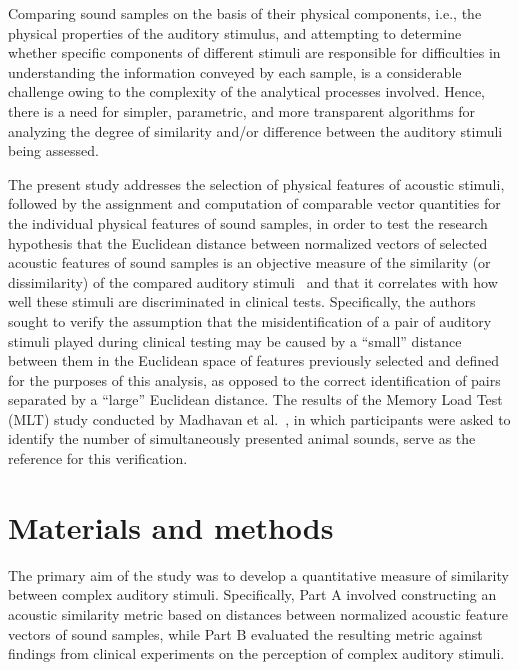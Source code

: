 \documentclass[doubleblind,preprint,12pt]{elsarticle}
\begin{document}
Comparing sound samples on the basis of their physical components, i.e., the physical properties of the auditory stimulus, and attempting to determine whether specific components of different stimuli are responsible for difficulties in understanding the information conveyed by each sample, is a considerable challenge owing to the complexity of the analytical processes involved. Hence, there is a need for simpler, parametric, and more transparent algorithms for analyzing the degree of similarity and/or difference between the auditory stimuli being assessed.

The present study addresses the selection of physical features of acoustic stimuli, followed by the assignment and computation of comparable vector quantities for the individual physical features of sound samples, in order to test the research hypothesis that the Euclidean distance between normalized vectors of selected acoustic features of sound samples is an objective measure of the similarity (or dissimilarity) of the compared auditory stimuli~\cite{MadhavanWrobel2024MLT} and that it correlates with how well these stimuli are discriminated in clinical tests. Specifically, the authors sought to verify the assumption that the misidentification of a pair of auditory stimuli played during clinical testing may be caused by a ``small'' distance between them in the Euclidean space of features previously selected and defined for the purposes of this analysis, as opposed to the correct identification of pairs separated by a ``large'' Euclidean distance. The results of the Memory Load Test (MLT) study conducted by Madhavan et al.~\cite{MadhavanWrobel2024MLT}, in which participants were asked to identify the number of simultaneously presented animal sounds, serve as the reference for this verification.


\section{Materials and methods}
\label{section:mat_met}

The primary aim of the study was to develop a quantitative measure of similarity between complex auditory stimuli. Specifically, Part A involved constructing an acoustic similarity metric based on distances between normalized acoustic feature vectors of sound samples, while Part B evaluated the resulting metric against findings from clinical experiments on the perception of complex auditory stimuli.
\end{document}
